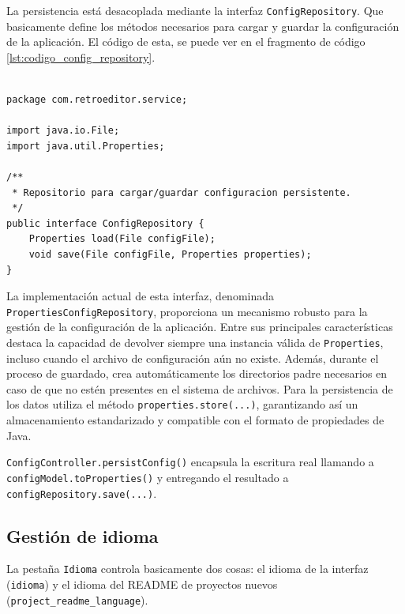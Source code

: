 \documentclass[../../main.tex]{subfiles}
\begin{document}
La persistencia está desacoplada mediante la interfaz \lstinline|ConfigRepository|. Que basicamente define los métodos necesarios para cargar y guardar la configuración de la aplicación. El código de esta, se puede ver en el fragmento de código \ref{lst:codigo_config_repository}.

\begin{lstlisting}[style=mystyle, caption={Código de la interfaz ConfigRepository}, label={lst:codigo_config_repository}]

package com.retroeditor.service;

import java.io.File;
import java.util.Properties;

/**
 * Repositorio para cargar/guardar configuracion persistente.
 */
public interface ConfigRepository {
    Properties load(File configFile);
    void save(File configFile, Properties properties);
}

\end{lstlisting}

La implementación actual de esta interfaz, denominada \lstinline|PropertiesConfigRepository|, proporciona un mecanismo robusto para la gestión de la configuración de la aplicación. Entre sus principales características destaca la capacidad de devolver siempre una instancia válida de \lstinline|Properties|, incluso cuando el archivo de configuración aún no existe. Además, durante el proceso de guardado, crea automáticamente los directorios padre necesarios en caso de que no estén presentes en el sistema de archivos. Para la persistencia de los datos utiliza el método \lstinline|properties.store(...)|, garantizando así un almacenamiento estandarizado y compatible con el formato de propiedades de Java.


\lstinline|ConfigController.persistConfig()| encapsula la escritura real llamando a \lstinline|configModel.toProperties()| y entregando el resultado a \lstinline|configRepository.save(...)|.

\clearpage

\subsection{Gestión de idioma}

La pestaña \lstinline|Idioma| controla basicamente dos cosas: el idioma de la interfaz (\lstinline|idioma|) y el idioma del README de proyectos nuevos (\lstinline|project_readme_language|).
\end{document}
